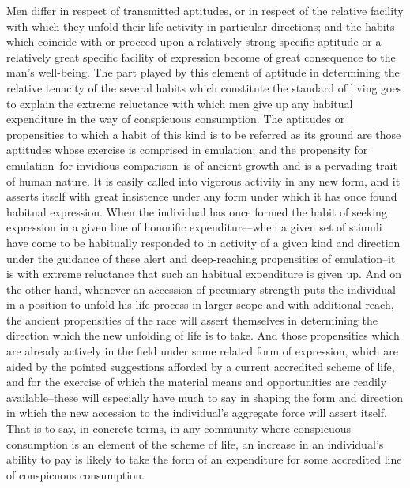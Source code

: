 \documentclass[12pt]{report}
\begin{document}
Men differ in respect of transmitted aptitudes, or in respect of
the relative facility with which they unfold their life activity in
particular directions; and the habits which coincide with or proceed
upon a relatively strong specific aptitude or a relatively great
specific facility of expression become of great consequence to the man's
well-being. The part played by this element of aptitude in determining
the relative tenacity of the several habits which constitute the
standard of living goes to explain the extreme reluctance with which men
give up any habitual expenditure in the way of conspicuous consumption.
The aptitudes or propensities to which a habit of this kind is to be
referred as its ground are those aptitudes whose exercise is comprised
in emulation; and the propensity for emulation--for invidious
comparison--is of ancient growth and is a pervading trait of human
nature. It is easily called into vigorous activity in any new form, and
it asserts itself with great insistence under any form under which it
has once found habitual expression. When the individual has once
formed the habit of seeking expression in a given line of honorific
expenditure--when a given set of stimuli have come to be habitually
responded to in activity of a given kind and direction under the
guidance of these alert and deep-reaching propensities of emulation--it
is with extreme reluctance that such an habitual expenditure is given
up. And on the other hand, whenever an accession of pecuniary strength
puts the individual in a position to unfold his life process in larger
scope and with additional reach, the ancient propensities of the race
will assert themselves in determining the direction which the new
unfolding of life is to take. And those propensities which are already
actively in the field under some related form of expression, which are
aided by the pointed suggestions afforded by a current accredited
scheme of life, and for the exercise of which the material means and
opportunities are readily available--these will especially have much to
say in shaping the form and direction in which the new accession to
the individual's aggregate force will assert itself. That is to say,
in concrete terms, in any community where conspicuous consumption is an
element of the scheme of life, an increase in an individual's ability
to pay is likely to take the form of an expenditure for some accredited
line of conspicuous consumption.
\end{document}
